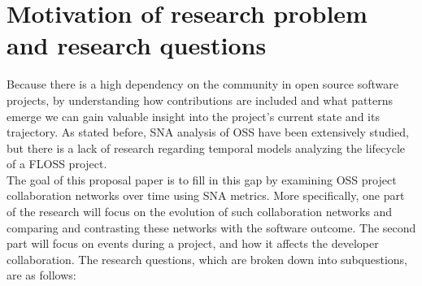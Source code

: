 \section{Motivation of research problem and research questions}
Because there is a high dependency on the community in open source software projects, by understanding how contributions are included and what patterns emerge we can gain valuable insight into the project's current state and its trajectory. As stated before, SNA analysis of OSS have been extensively studied, but there is a lack of research regarding temporal models analyzing the lifecycle of a FLOSS project. \\

The goal of this proposal paper is to fill in this gap by examining OSS project collaboration networks over time using SNA metrics. More specifically, one part of the research will focus on the evolution of such collaboration networks and comparing and contrasting these networks with the software outcome. The second part will focus on events during a project, and how it affects the developer collaboration. The research questions, which are broken down into subquestions, are as follows:

